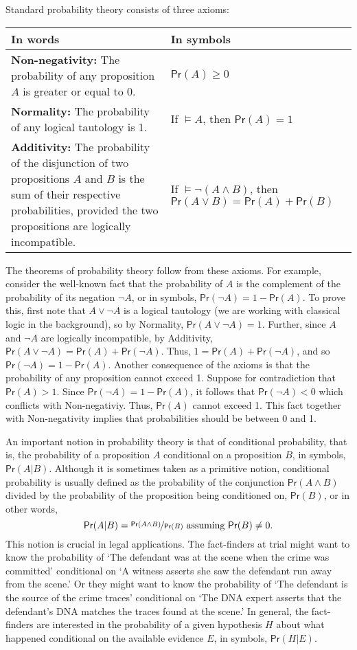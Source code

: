 \documentclass{article}
\newcommand{\pr}{\mathsf{Pr}}
\begin{document}
%
Standard probability theory  consists of  three axioms: %
\begin{center}
\begin{tabular}{@{}p{7cm}p{4.5cm}@{}}\toprule
 In words & In symbols \\ \midrule
\textbf{Non-negativity:}   The probability of any proposition $A$
is greater or equal to 0. & $\pr(A)\geq 0$\\
 \textbf{Normality:}  The probability of any 
logical tautology is 1.  & If $\models A$, then $\pr(A)=1$\\
\textbf{Additivity:}   The probability of the disjunction 
of two propositions $A$ and $B$  is the sum of their 
respective probabilities, provided the two propositions are logically incompatible. 
& 
If $\models  \neg (A \wedge B)$, then \newline
$\pr(A\vee B)=\pr(A)+\pr(B)$\\ \bottomrule 
\end{tabular}
\end{center}
%
The theorems of probability theory follow from these axioms. For example, consider the well-known fact that the probability of $A$ is the complement of the probability 
of its negation $\neg A$, or in symbols, $\pr(\neg A)=1-\pr(A)$.
To prove this, first note that 
$A \vee \neg A$ is a logical tautology (we are working with classical logic in the background), so by Normality, $\pr(A\vee \neg A)=1$. Further, since 
$A$ and $\neg A$ are logically incompatible, by Additivity, $\pr(A\vee \neg A)= \pr(A)+ \pr(\neg A)$. Thus, $1 = \pr(A)+ \pr(\neg A)$, and so $\pr(\neg A) = 1- \pr(A)$. Another consequence of the axioms is that the probability of any proposition cannot exceed 1. Suppose for contradiction that $\pr(A)>1$. Since
$\pr(\neg A)=1-\pr(A)$, it follows that
$\pr(\neg A)<0$ which conflicts with  Non-negativiy.
Thus, $\pr(A)$ cannot exceed 1. This fact together with Non-negativity  implies that  probabilities should be between 0 and 1. 

 An important notion in probability theory is that of conditional probability, that is, the probability of a proposition $A$ conditional on a proposition $B$, in symbols, $\pr( A\vert B)$. Although it is sometimes taken as a primitive notion, conditional probability is usually defined as the probability of the conjunction
 $\pr(A \wedge B)$ divided by the probability of the proposition being conditioned on, $\pr(B)$, or in other words,
 \[\pr(A \vert B)= \nicefrac{\pr(A \wedge B)}{\pr(B)} \text{ assuming $\pr(B)\neq 0$.} \]
 This notion is crucial in legal applications. 
The fact-finders at trial might want to know the probability of `The defendant was at the scene when the crime was committed' conditional on 
`A witness asserts she saw the defendant run away from 
the scene.' Or they might want to know the probability of `The defendant is the source of the crime traces' conditional on `The DNA expert asserts that the defendant's DNA matches the traces found at the scene.'  In general, the fact-finders are interested in the probability of a given hypothesis $H$ about what happened conditional on the available evidence $E$, in symbols, $\pr(H \vert E)$.
\end{document}
